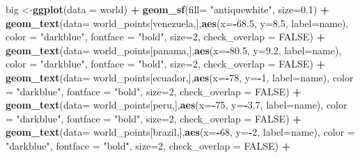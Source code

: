 \documentclass[12pt,twoside]{reedthesis}
\newenvironment{Shaded}{\begin{snugshade}}{\end{snugshade}}
\newcommand{\DataTypeTok}[1]{\textcolor[rgb]{0.13,0.29,0.53}{#1}}
\newcommand{\DecValTok}[1]{\textcolor[rgb]{0.00,0.00,0.81}{#1}}
\newcommand{\FloatTok}[1]{\textcolor[rgb]{0.00,0.00,0.81}{#1}}
\newcommand{\KeywordTok}[1]{\textcolor[rgb]{0.13,0.29,0.53}{\textbf{#1}}}
\newcommand{\NormalTok}[1]{#1}
\newcommand{\OperatorTok}[1]{\textcolor[rgb]{0.81,0.36,0.00}{\textbf{#1}}}
\newcommand{\OtherTok}[1]{\textcolor[rgb]{0.56,0.35,0.01}{#1}}
\newcommand{\StringTok}[1]{\textcolor[rgb]{0.31,0.60,0.02}{#1}}
\begin{document}
\begin{Shaded}
\begin{Highlighting}[]
{{{{\NormalTok{big <-}\KeywordTok{ggplot}\NormalTok{(}\DataTypeTok{data =}\NormalTok{ world) }\OperatorTok{+}\StringTok{ }
\StringTok{  }\KeywordTok{geom_sf}\NormalTok{(}\DataTypeTok{fill=} \StringTok{"antiquewhite"}\NormalTok{,  }\DataTypeTok{size=}\FloatTok{0.1}\NormalTok{) }\OperatorTok{+}\StringTok{ }
\StringTok{  }\KeywordTok{geom_text}\NormalTok{(}\DataTypeTok{data=}\NormalTok{ world_points[venezuela,],}\KeywordTok{aes}\NormalTok{(}\DataTypeTok{x=}\OperatorTok{-}\FloatTok{68.5}\NormalTok{, }\DataTypeTok{y=}\FloatTok{8.5}\NormalTok{, }\DataTypeTok{label=}\NormalTok{name), }\DataTypeTok{color =} \StringTok{"darkblue"}\NormalTok{, }\DataTypeTok{fontface =} \StringTok{"bold"}\NormalTok{, }\DataTypeTok{size=}\DecValTok{2}\NormalTok{, }\DataTypeTok{check_overlap =} \OtherTok{FALSE}\NormalTok{) }\OperatorTok{+}
\StringTok{  }\KeywordTok{geom_text}\NormalTok{(}\DataTypeTok{data=}\NormalTok{ world_points[panama,],}\KeywordTok{aes}\NormalTok{(}\DataTypeTok{x=}\OperatorTok{-}\FloatTok{80.5}\NormalTok{, }\DataTypeTok{y=}\FloatTok{9.2}\NormalTok{, }\DataTypeTok{label=}\NormalTok{name), }\DataTypeTok{color =} \StringTok{"darkblue"}\NormalTok{, }\DataTypeTok{fontface =} \StringTok{"bold"}\NormalTok{, }\DataTypeTok{size=}\DecValTok{2}\NormalTok{, }\DataTypeTok{check_overlap =} \OtherTok{FALSE}\NormalTok{) }\OperatorTok{+}\StringTok{ }
\StringTok{  }\KeywordTok{geom_text}\NormalTok{(}\DataTypeTok{data=}\NormalTok{ world_points[ecuador,],}\KeywordTok{aes}\NormalTok{(}\DataTypeTok{x=}\OperatorTok{-}\DecValTok{78}\NormalTok{, }\DataTypeTok{y=}\OperatorTok{-}\DecValTok{1}\NormalTok{, }\DataTypeTok{label=}\NormalTok{name), }\DataTypeTok{color =} \StringTok{"darkblue"}\NormalTok{, }\DataTypeTok{fontface =} \StringTok{"bold"}\NormalTok{, }\DataTypeTok{size=}\DecValTok{2}\NormalTok{, }\DataTypeTok{check_overlap =} \OtherTok{FALSE}\NormalTok{) }\OperatorTok{+}
\StringTok{  }\KeywordTok{geom_text}\NormalTok{(}\DataTypeTok{data=}\NormalTok{ world_points[peru,],}\KeywordTok{aes}\NormalTok{(}\DataTypeTok{x=}\OperatorTok{-}\DecValTok{75}\NormalTok{, }\DataTypeTok{y=}\OperatorTok{-}\FloatTok{3.7}\NormalTok{, }\DataTypeTok{label=}\NormalTok{name), }\DataTypeTok{color =} \StringTok{"darkblue"}\NormalTok{, }\DataTypeTok{fontface =} \StringTok{"bold"}\NormalTok{, }\DataTypeTok{size=}\DecValTok{2}\NormalTok{, }\DataTypeTok{check_overlap =} \OtherTok{FALSE}\NormalTok{) }\OperatorTok{+}
\StringTok{  }\KeywordTok{geom_text}\NormalTok{(}\DataTypeTok{data=}\NormalTok{ world_points[brazil,],}\KeywordTok{aes}\NormalTok{(}\DataTypeTok{x=}\OperatorTok{-}\DecValTok{68}\NormalTok{, }\DataTypeTok{y=}\OperatorTok{-}\DecValTok{2}\NormalTok{, }\DataTypeTok{label=}\NormalTok{name), }\DataTypeTok{color =} \StringTok{"darkblue"}\NormalTok{, }\DataTypeTok{fontface =} \StringTok{"bold"}\NormalTok{, }\DataTypeTok{size=}\DecValTok{2}\NormalTok{, }\DataTypeTok{check_overlap =} \OtherTok{FALSE}\NormalTok{) }\OperatorTok{+}
}}}}
\end{Highlighting}
\end{Shaded}
\end{document}
